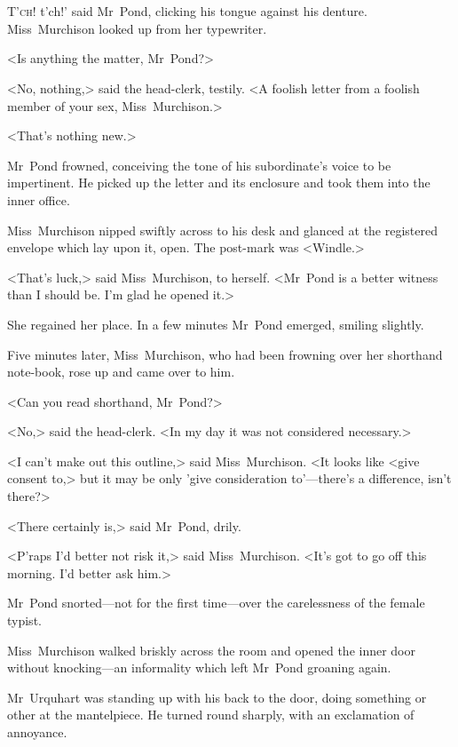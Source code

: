 \chapter[Chapter \thechapter]{}
\lettrine[ante=`]{T}{'ch!} t'ch!' said Mr~Pond, clicking his tongue against his denture.
\zz
Miss~Murchison looked up from her typewriter.

\zz
<Is anything the matter, Mr~Pond?>

\zz
<No, nothing,> said the head-clerk, testily. <A foolish letter from a foolish member of your sex, Miss~Murchison.>

<That's nothing new.>

Mr~Pond frowned, conceiving the tone of his subordinate's voice to be impertinent. He picked up the letter and its enclosure and took them into the inner office.

Miss~Murchison nipped swiftly across to his desk and glanced at the registered envelope which lay upon it, open. The post-mark was <Windle.>

<That's luck,> said Miss~Murchison, to herself. <Mr~Pond is a better witness than I should be. I'm glad he opened it.>

She regained her place. In a few minutes Mr~Pond emerged, smiling slightly.

Five minutes later, Miss~Murchison, who had been frowning over her shorthand note-book, rose up and came over to him.

<Can you read shorthand, Mr~Pond?>

<No,> said the head-clerk. <In my day it was not considered necessary.>

<I can't make out this outline,> said Miss~Murchison. <It looks like <give consent to,> but it may be only 'give consideration to'—there's a difference, isn't there?>

<There certainly is,> said Mr~Pond, drily.

<P'raps I'd better not risk it,> said Miss~Murchison. <It's got to go off this morning. I'd better ask him.>

Mr~Pond snorted—not for the first time—over the carelessness of the female typist.

Miss~Murchison walked briskly across the room and opened the inner door without knocking—an informality which left Mr~Pond groaning again.

Mr~Urquhart was standing up with his back to the door, doing something or other at the mantelpiece. He turned round sharply, with an exclamation of annoyance.

